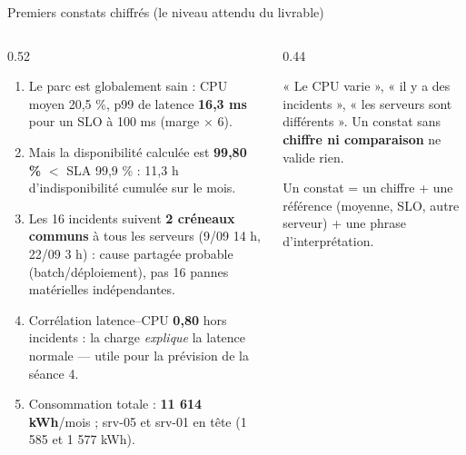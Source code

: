\begin{frame}{Premiers constats chiffrés (le niveau attendu du livrable)}
\begin{columns}[t]
\begin{column}{0.52\textwidth}
\begin{solbox}
\begin{enumerate}
\item Le parc est globalement sain : CPU moyen 20,5 \%,
p99 de latence \textbf{16,3 ms} pour un SLO à 100 ms
(marge $\times$ 6).
\item Mais la disponibilité calculée est \textbf{99,80 \%} $<$ SLA 99,9 \% :
11,3 h d'indisponibilité cumulée sur le mois.
\item Les 16 incidents suivent \textbf{2 créneaux communs} à tous les serveurs
(9/09 14 h, 22/09 3 h) : cause partagée probable (batch/déploiement),
pas 16 pannes matérielles indépendantes.
\item Corrélation latence--CPU \textbf{0,80} hors incidents : la charge
\emph{explique} la latence normale --- utile pour la prévision de la séance 4.
\item Consommation totale : \textbf{11 614 kWh}/mois ; srv-05 et srv-01
en tête (1 585 et 1 577 kWh).
\end{enumerate}
\end{solbox}
\end{column}
\begin{column}{0.44\textwidth}
\begin{wbox}
« Le CPU varie », « il y a des incidents », « les serveurs sont différents ».
Un constat sans \textbf{chiffre ni comparaison} ne valide rien.
\end{wbox}
\begin{kbox}
Un constat = un chiffre + une référence (moyenne, SLO, autre serveur)
+ une phrase d'interprétation.
\end{kbox}
\end{column}
\end{columns}
\end{frame}

